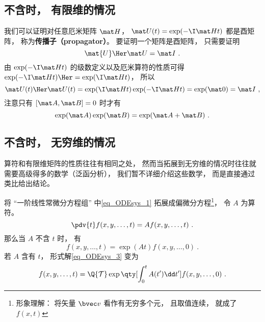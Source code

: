 

\subsection{不含时， 有限维的情况}
我们可以证明对任意厄米矩阵 $\mat H$， $\mat U(t) = \exp(-\I \mat H t)$ 都是酉矩阵， 称为\textbf{传播子（propagator）}。 要证明一个矩阵是酉矩阵， 只需要证明
\begin{equation}
\mat{U}\Her \mat U = \mat I~.
\end{equation}
由 $\exp(-\I \mat H t)$ 的级数定义以及厄米算符的性质可得 $\exp(-\I \mat H t)\Her = \exp(\I \mat H t)$， 所以
\begin{equation}
\mat U(t)\Her \mat U(t) = \exp(\I \mat H t) \exp(-\I \mat H t) = \exp(\mat 0) = \mat I~,
\end{equation}
注意只有 $[\mat A, \mat B] = 0$ 时才有
\begin{equation}\label{eq_OpExp_1}
\exp(\mat A)\exp(\mat B) = \exp(\mat A + \mat B)~.
\end{equation}

\subsection{不含时， 无穷维的情况}

算符和有限维矩阵的性质往往有相同之处， 然而当拓展到无穷维的情况时往往就需要高级得多的数学（泛函分析）， 我们暂不详细介绍这些数学， 而是直接通过类比给出结论。

将 “一阶线性常微分方程组” 中\autoref{eq_ODEsys_1} 拓展成偏微分方程\footnote{形象理解： 将矢量 $\bvec v$ 看作有无穷多个元， 且取值连续， 就成了 $f(x, t)$}， 令 $A$ 为算符。
\begin{equation}
\pdv{t} f(x, y, \dots, t) = A f(x, y, \dots, t)~.
\end{equation}
那么当 $A$ 不含 $t$ 时， 有
\begin{equation}
f(x, y, \dots, t) = \exp(A t) f(x, y, \dots, 0)~.
\end{equation}
若 $A$ 含有 $t$， 形式解\autoref{eq_ODEsys_3}  变为
\begin{equation}
f(x, y, \dots, t) = \Q {\mathcal T} \exp\qty[\int_0^ t A(t')\dd t'] f(x, y, \dots, 0)~.
\end{equation}

